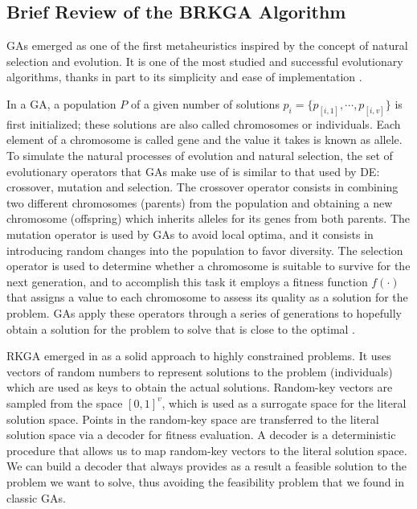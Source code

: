 \subsection[Brief Review of the \acsfont{BRKGA} Algorithm]{Brief Review of the BRKGA Algorithm} \label{sec:brkga}

\acp{GA} emerged as one of the first metaheuristics inspired by the concept of natural selection and evolution. It is one of the most studied and successful evolutionary algorithms, thanks in part to its simplicity and ease of implementation \cite{fausto2019ants, goldberg1989genetic}. 

In a \acs{GA}, a population $P$ of a given number of solutions \sloppy $p_i = \{p_{[i,1]}, \cdots, p_{[i,v]}\}$ is first initialized; these solutions are also called chromosomes or individuals. Each element of a chromosome is called gene and the value it takes is known as allele. To simulate the natural processes of evolution and natural selection, the set of evolutionary operators that \acsp{GA} make use of is similar to that used by \acs{DE}: crossover, mutation and selection. The crossover operator consists in combining two different chromosomes (parents) from the population and obtaining a new chromosome (offspring) which inherits alleles for its genes from both parents. The mutation operator is used by \acsp{GA} to avoid local optima, and it consists in introducing random changes into the population to favor diversity. The selection operator is used to determine whether a chromosome is suitable to survive for the next generation, and to accomplish this task it employs a fitness function $f(\cdot)$ that assigns a value to each chromosome to assess its quality as a solution for the problem. \acsp{GA} apply these operators through a series of generations to hopefully obtain a solution for the problem to solve that is close to the optimal \cite{fausto2019ants}.  

\acf{RKGA} emerged in \cite{bean1994genetic} as a solid approach to highly constrained problems. It uses vectors of random numbers to represent solutions to the problem (individuals) which are used as keys to obtain the actual solutions. Random-key vectors are sampled from the space $[0,1]^{v}$, which is used as a surrogate space for the literal solution space. Points in the random-key space are transferred to the literal solution space via a decoder for fitness evaluation. A decoder is a deterministic procedure that allows us to map random-key vectors to the literal solution space. We can build a decoder that always provides as a result a feasible solution to the problem we want to solve, thus avoiding the feasibility problem that we found in classic \acsp{GA}.

